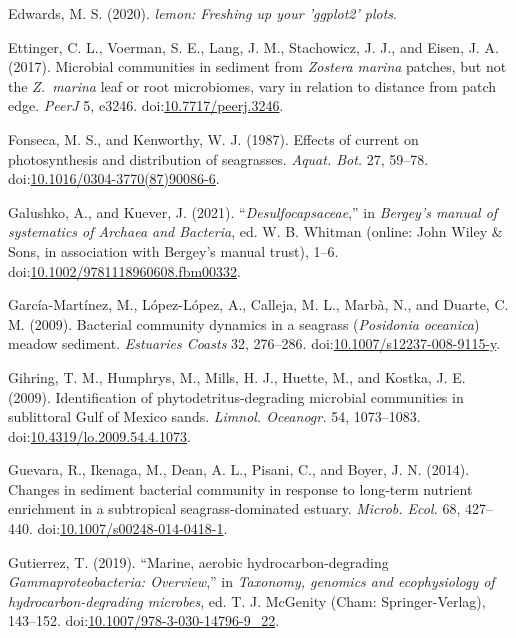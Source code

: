 \documentclass[12pt,]{article}
\begin{document}
\leavevmode\hypertarget{ref-Edwards2020}{}%
Edwards, M. S. (2020). \emph{lemon: Freshing up your 'ggplot2' plots}.

\leavevmode\hypertarget{ref-Ettinger2017b}{}%
Ettinger, C. L., Voerman, S. E., Lang, J. M., Stachowicz, J. J., and
Eisen, J. A. (2017). Microbial communities in sediment from
\emph{Zostera marina} patches, but not the \emph{Z.~marina} leaf or root
microbiomes, vary in relation to distance from patch edge. \emph{PeerJ}
5, e3246.
doi:\href{https://doi.org/10.7717/peerj.3246}{10.7717/peerj.3246}.

\leavevmode\hypertarget{ref-Fonseca1987}{}%
Fonseca, M. S., and Kenworthy, W. J. (1987). Effects of current on
photosynthesis and distribution of seagrasses. \emph{Aquat. Bot.} 27,
59--78.
doi:\href{https://doi.org/10.1016/0304-3770(87)90086-6}{10.1016/0304-3770(87)90086-6}.

\leavevmode\hypertarget{ref-Galushko2021}{}%
Galushko, A., and Kuever, J. (2021).
``\emph{Desulfocapsaceae\textup{}},'' in \emph{Bergey's manual of
systematics of Archaea and Bacteria}, ed. W. B. Whitman (online: John
Wiley \& Sons, in association with Bergey's manual trust), 1--6.
doi:\href{https://doi.org/10.1002/9781118960608.fbm00332}{10.1002/9781118960608.fbm00332}.

\leavevmode\hypertarget{ref-Garcia-Martinez2009a}{}%
García-Martínez, M., López-López, A., Calleja, M. L., Marbà, N., and
Duarte, C. M. (2009). Bacterial community dynamics in a seagrass
(\emph{Posidonia oceanica}) meadow sediment. \emph{Estuaries Coasts} 32,
276--286.
doi:\href{https://doi.org/10.1007/s12237-008-9115-y}{10.1007/s12237-008-9115-y}.

\leavevmode\hypertarget{ref-Gihring2009}{}%
Gihring, T. M., Humphrys, M., Mills, H. J., Huette, M., and Kostka, J.
E. (2009). Identification of phytodetritus-degrading microbial
communities in sublittoral Gulf of Mexico sands. \emph{Limnol.
Oceanogr.} 54, 1073--1083.
doi:\href{https://doi.org/10.4319/lo.2009.54.4.1073}{10.4319/lo.2009.54.4.1073}.

\leavevmode\hypertarget{ref-Guevara2014}{}%
Guevara, R., Ikenaga, M., Dean, A. L., Pisani, C., and Boyer, J. N.
(2014). Changes in sediment bacterial community in response to long-term
nutrient enrichment in a subtropical seagrass-dominated estuary.
\emph{Microb. Ecol.} 68, 427--440.
doi:\href{https://doi.org/10.1007/s00248-014-0418-1}{10.1007/s00248-014-0418-1}.

\leavevmode\hypertarget{ref-Gutierrez2019}{}%
Gutierrez, T. (2019). ``Marine, aerobic hydrocarbon-degrading
\emph{Gammaproteobacteria\textup{: Overview}},'' in \emph{Taxonomy,
genomics and ecophysiology of hydrocarbon-degrading microbes}, ed. T. J.
McGenity (Cham: Springer-Verlag), 143--152.
doi:\href{https://doi.org/10.1007/978-3-030-14796-9_22}{10.1007/978-3-030-14796-9\_22}.
\end{document}
